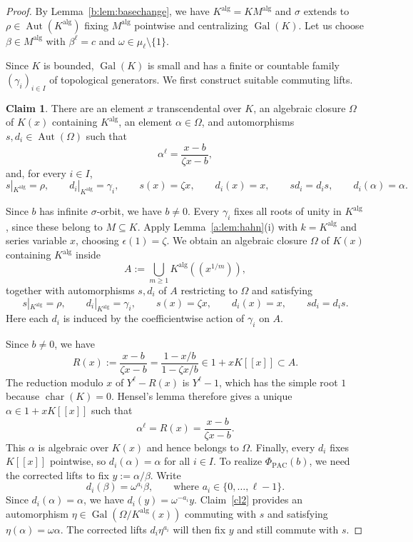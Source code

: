 \documentclass[11pt,a4paper]{amsart}
\renewcommand{\ge}{\geqslant}
\theoremstyle{definition}
\newtheorem{claim}{Claim}
\newenvironment{claimproof}[1][Proof of Claim \theclaim.]
 {%
	\proof[#1]%
\renewcommand*\qedsymbol{$\square$\tiny{Claim \theclaim}}
}
{%
	\endproof%
}
\newcommand{\alg}{\mathrm{alg}}
\DeclareMathOperator{\Gal}{Gal}
\DeclareMathOperator{\Aut}{Aut}
\DeclareMathOperator{\charac}{char}
\begin{document}
\begin{proof}
By Lemma~\ref{b:lem:basechange}, we have
$K^{\alg}=KM^{\alg}$ and $\sigma$ extends to
$\rho\in\Aut(K^{\alg})$ fixing $M^{\alg}$ pointwise and centralizing
$\Gal(K)$. Let us choose $\beta\in M^{\alg}$ with $\beta^\ell=c$ and $\omega\in \mu_\ell\setminus \{1\}$.

Since $K$ is bounded, $\Gal(K)$ is small and has a finite or
countable family $(\gamma_i)_{i\in I}$ of topological generators.
We first construct suitable commuting lifts.

\begin{claim}\label{cl1}
There are an element $x$ transcendental over $K$, an algebraic
closure $\Omega$ of $K(x)$ containing $K^{\alg}$, an element
$\alpha\in\Omega$, and automorphisms $s,d_i\in\Aut(\Omega)$ such that
\[
\alpha^\ell=\frac{x-b}{\zeta x-b},
\]
and, for every $i\in I$,
\[
s|_{K^{\alg}}=\rho,\qquad
d_i|_{K^{\alg}}=\gamma_i,\qquad
s(x)=\zeta x,\qquad d_i(x)=x,\qquad
sd_i=d_is,\qquad d_i(\alpha)=\alpha.
\]
\end{claim}

\begin{claimproof}
Since $b$ has infinite $\sigma$-orbit, we have $b\ne0$.
Every $\gamma_i$ fixes all roots of unity in $K^{\alg}$,
since these belong to $M\subseteq K$.
Apply Lemma~\ref{a:lem:hahn}\textup{(i)} with
$k=K^{\alg}$ and series variable $x$, choosing
$\epsilon(1)=\zeta$.
We obtain an algebraic closure $\Omega$ of $K(x)$
containing $K^{\alg}$ inside
\[
A:=\bigcup_{m\ge1}K^{\alg}((x^{1/m})),
\]
together with automorphisms $s,d_i$ of $A$ restricting to $\Omega$ and satisfying
\[
s|_{K^{\alg}}=\rho,\qquad
d_i|_{K^{\alg}}=\gamma_i,\qquad
s(x)=\zeta x,\qquad d_i(x)=x,\qquad sd_i=d_is.
\]
Here each $d_i$ is induced by the coefficientwise action
of $\gamma_i$ on $A$.

Since $b\ne0$, we have
\[
R(x):=\frac{x-b}{\zeta x-b}
     =\frac{1-x/b}{1-\zeta x/b}
     \in1+xK[[x]]\subset A.
\]
The reduction modulo $x$ of $Y^\ell-R(x)$ is
$Y^\ell-1$, which has the simple root $1$ because
$\charac(K)=0$.
Hensel's lemma therefore gives a unique
$\alpha\in1+xK[[x]]$ such that
\[
\alpha^\ell=R(x)=\frac{x-b}{\zeta x-b}.
\]
This $\alpha$ is algebraic over $K(x)$ and hence belongs
to $\Omega$. Finally, every $d_i$ fixes $K[[x]]$
pointwise, so $d_i(\alpha)=\alpha$ for all $i\in I$.
\end{claimproof}
To realize $\Phi_{\mathrm{PAC}}(b)$, we need the corrected
lifts to fix $y:=\alpha/\beta$. Write
\[
d_i(\beta)=\omega^{a_i}\beta,
\qquad \text{where }a_i\in\{0,\ldots,\ell-1\}.
\]
Since $d_i(\alpha)=\alpha$, we have
$d_i(y)=\omega^{-a_i}y$.
Claim~\ref{cl2} provides an automorphism
$\eta\in\Gal(\Omega/K^{\alg}(x))$ commuting with $s$
and satisfying $\eta(\alpha)=\omega\alpha$.
The corrected lifts $d_i\eta^{a_i}$ will then fix $y$
and still commute with $s$.


\end{proof}
\end{document}
